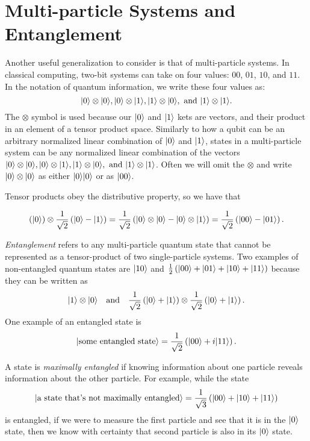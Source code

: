 \section{Multi-particle Systems and Entanglement}


Another useful generalization to consider is that of multi-particle systems. In classical computing, two-bit systems can take on four values: $00$, $01$, $10$, and $11$. In the notation of quantum information, we write these four values as: 
\[
| 0 \rangle \otimes | 0 \rangle, | 0 \rangle \otimes | 1 \rangle, | 1 \rangle \otimes | 0 \rangle, \text{ and } | 1 \rangle \otimes | 1 \rangle.
\] The $\otimes$ symbol is used because our $| 0 \rangle$ and $| 1 \rangle$ kets are vectors, and their product in an element of a tensor product space. Similarly to how a qubit can be an arbitrary normalized linear combination of $| 0 \rangle$ and $| 1 \rangle$, states in a multi-particle system can be any normalized linear combination of the vectors $| 0 \rangle \otimes | 0 \rangle, | 0 \rangle \otimes | 1 \rangle, | 1 \rangle \otimes | 0 \rangle, \text{ and } | 1 \rangle \otimes | 1 \rangle$. Often we will omit the $\otimes$ and write $| 0 \rangle \otimes | 0 \rangle$ as either $| 0 \rangle | 0 \rangle$ or as $| 00 \rangle$.

Tensor products obey the distributive property, so we have that 

\[
\left(| 0 \rangle\right)\otimes \frac{1}{\sqrt{2}}\left(| 0 \rangle - | 1 \rangle\right) = \frac{1}{\sqrt{2}}\left(| 0 \rangle \otimes | 0 \rangle -  | 0 \rangle\otimes| 1 \rangle\right) = \frac{1}{\sqrt{2}}\left(| 00 \rangle -  | 01 \rangle\right).
\]

\textit{Entanglement} refers to any multi-particle quantum state that cannot be represented as a tensor-product of two single-particle systems. Two examples of non-entangled quantum states are $| 10 \rangle$ and $\frac{1}{2}\left(| 00 \rangle + | 01 \rangle  +| 10 \rangle  + | 11 \rangle\right)$ because they can be written as 
\[
| 1 \rangle \otimes | 0 \rangle \quad\text{and}\quad \frac{1}{\sqrt{2}}\left(| 0 \rangle + | 1 \rangle\right) \otimes \frac{1}{\sqrt{2}}\left(| 0 \rangle + | 1 \rangle\right).
\] One example of an entangled state is
\[
| \text{some entangled state} \rangle = \frac{1}{\sqrt{2}}\left(| 00 \rangle + i| 11 \rangle\right).
\]


A state is \textit{maximally entangled} if knowing information about one particle reveals information about the other particle. For example, while the state 
\[
| \text{a state that's not maximally entangled} \rangle = \frac{1}{\sqrt{3}}\left(| 00 \rangle + | 10 \rangle + | 11 \rangle\right)
\] is entangled, if we were to measure the first particle and see that it is in the $| 0 \rangle$ state, then we know with certainty that second particle is also in its $| 0 \rangle$ state.

